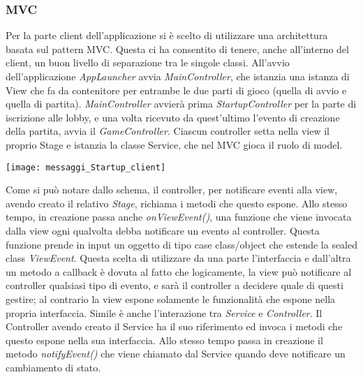 \subsubsection{MVC}
Per la parte client dell’applicazione si è scelto di utilizzare una architettura basata sul pattern MVC\@.
Questa ci ha consentito di tenere, anche all’interno del client, un buon livello di separazione tra le singole classi.
\newline
All’avvio dell’applicazione \textit{AppLauncher} avvia \textit{MainController}, che istanzia una istanza di View che fa da contenitore per entrambe le due parti di gioco (quella di avvio e quella di partita).
\textit{MainController} avvierà prima \textit{StartupController} per la parte di iscrizione alle lobby, e una volta ricevuto da quest’ultimo l'evento di creazione della partita, avvia il \textit{GameController}.
Ciascun controller setta nella view il proprio Stage e istanzia la classe Service, che nel MVC gioca il ruolo di model.
\begin{center}
    \texttt{[image: messaggi\_Startup\_client]}
\end{center}
Come si può notare dallo schema, il controller, per notificare eventi alla view, avendo creato il relativo \textit{Stage}, richiama i metodi che questo espone.
\newline
Allo stesso tempo, in creazione passa anche \textit{onViewEvent()}, una funzione che viene invocata dalla view ogni qualvolta debba notificare un evento al controller.
Questa funzione prende in input un oggetto di tipo case class/object che estende la sealed class \textit{ViewEvent}.\newline
Questa scelta di utilizzare da una parte l’interfaccia e dall’altra un metodo a callback è dovuta al fatto che logicamente, la view può notificare al controller qualsiasi tipo di evento, e sarà il controller a decidere quale di questi gestire; al contrario la view espone solamente le funzionalità che espone nella propria interfaccia.
\newline \newline
Simile è anche l’interazione tra \textit{Service} e \textit{Controller}. Il Controller avendo creato il Service ha il suo riferimento ed invoca i metodi che questo espone nella sua interfaccia. Allo stesso tempo passa in creazione il metodo \textit{notifyEvent()} che viene chiamato dal Service quando deve notificare un cambiamento di stato.

